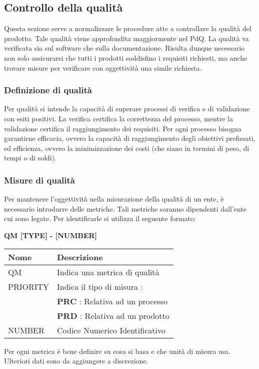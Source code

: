 \subsection{Controllo della qualità}
Questa sezione serve a normalizzare le procedure atte a controllare la qualità del prodotto.
Tale qualità viene approfondita maggiormente nel PdQ. \newline
La qualità va verificata sia sul software che sulla documentazione. \newline
Risulta dunque necessario non solo assicurarsi che tutti i prodotti soddisfino i requisiti richiesti, 
ma anche trovare misure per verificare con oggettività una simile richiesta.
\subsubsection{Definizione di qualità}
Per qualità si intende la capacità di superare processi di verifica e di validazione con esiti positivi. \newline 
La verifica certifica la correttezza del processo, mentre la validazione certifica il raggiungimento dei requisiti. \newline
Per ogni processo bisogna garantirne efficacia, ovvero la capacità di raggiungimento degli obiettivi 
prefissati, ed efficienza, ovvero la minimizzazione dei costi (che siano in termini di peso, di tempi o di soldi).
\subsubsection{Misure di qualità}
Per mantenere l'oggettività nella misurazione della qualità di un ente, è necessario introdurre delle metriche.
Tali metriche saranno dipendenti dall'ente cui sono legate. \newline
Per identificarle si utilizza il seguente formato:
\begin{center}
    \textbf{QM [TYPE] - [NUMBER]}
\end{center}
\renewcommand{\arraystretch}{1.8} %
    \begin{tabular}{ |m{7em}|m{30em}| }
        \hline
        \textbf{Nome} & \textbf{Descrizione} \\
        \hline
            QM & Indica una metrica di qualità \\
        \hline
            PRIORITY 	& 	Indica il tipo di misura : \\
                        &	\textbf{PRC} : Relativa ad un processo \\
                        &	\textbf{PRD} : Relativa ad un prodotto \\
        \hline
            NUMBER & Codice Numerico Identificativo \\
        \hline
    \end{tabular} \newline \newline
Per ogni metrica è bene definire su cosa si basa e che unità di misura usa. Ulteriori dati sono da aggiungere
a discrezione.
